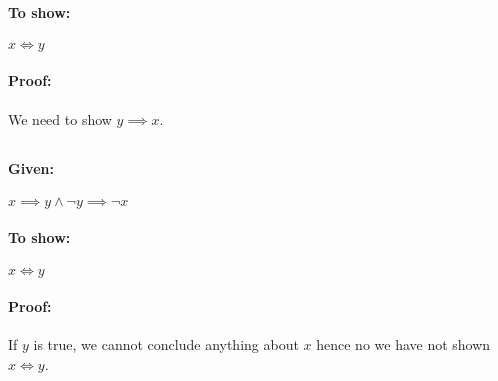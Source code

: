 \documentclass{report}
\begin{document}
\paragraph{To show: }  $ x \iff y$
\paragraph{Proof: } We need to show $ y \implies x$. 

\subsection{}
\paragraph{Given: } $x \implies y \land \neg y \implies \neg x$
\paragraph{To show: }  $x \iff y$
\paragraph{Proof:} If $y$ is true, we cannot conclude anything about $x$ hence no we have not shown $x\iff y$. 
\end{document}
